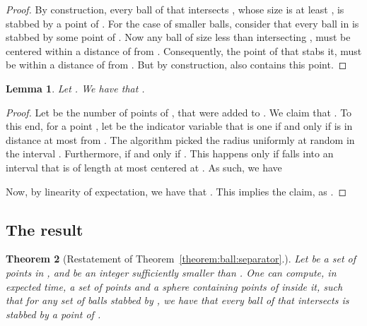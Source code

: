 \InSubmitVer{\documentclass[11pt]{article}}
\numberwithin{figure}{section}
\numberwithin{table}{section}
\numberwithin{equation}{section}
\newtheorem{theorem}{Theorem}[section] \newtheorem{lemma}[theorem]{Lemma}
\newcommand{\lemlab}[1]{\label{lemma:#1}}
\newcommand{\thmlab}[1]{\label{theorem:#1}}
\newcommand{\thmref}[1]{Theorem~\ref{theorem:#1}}
\begin{document}
\begin{proof}
    By construction, every ball of  that intersects
    , whose size is at least , is stabbed by a
    point of .  For the case of smaller balls, consider that
    every ball in  is stabbed by some point of . Now
    any ball of size less than  intersecting , must
    be centered within a distance of  from
    . Consequently, the point of  that stabs it, must
    be within a distance of  from . But by
    construction,  also contains this point.
\end{proof}


\begin{lemma}
    \lemlab{separator:size}Let . We have that .
\end{lemma}

\begin{proof}
    Let  be the number of points of , that were added to
    . We claim that .  To this
    end, for a point , let  be the indicator
    variable that is one if and only if  is in distance at most
     from . The algorithm picked the radius 
    uniformly at random in the interval . Furthermore,  if and only if
    . This happens only if  falls into an interval
     that is of length at most  centered at
    . As such, we have
    
    Now, by linearity of expectation, we have that . This implies the
    claim, as .
\end{proof}


\subsection{The result}
\begin{theorem}[Restatement of \thmref{ball:separator}.]
    \thmlab{ball:separator:restate}Let  be a set of points in , and  be an integer
    sufficiently smaller than .  One can compute, in
     expected time, a set  of
     points and a sphere  containing
     points of  inside it, such that for any set
     of balls stabbed by , we have that every ball
    of  that intersects  is stabbed by a point of
    .
\end{theorem}
\end{document}
